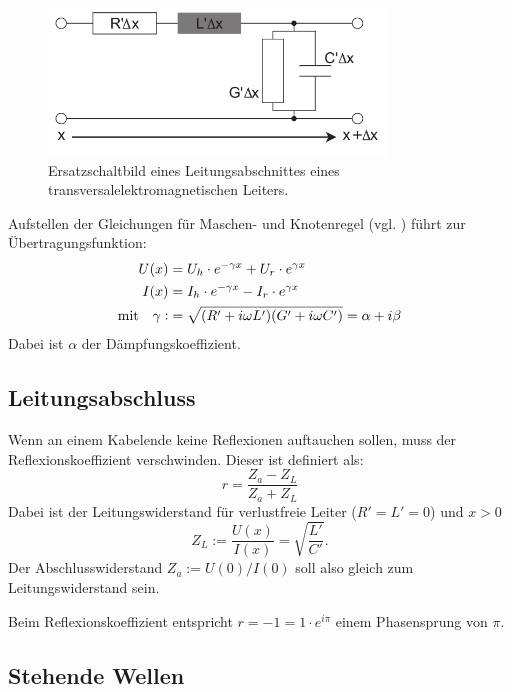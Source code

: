 \documentclass[
	a4paper,
	12pt,
	pagesize,
	ngerman
]{scrartcl}
\begin{document}
	\begin{figure}[H]
		\includegraphics[width=0.8\textwidth]{img/ersatzschaltbild}
		\centering
		\caption{
			Ersatzschaltbild eines Leitungsabschnittes eines transversalelektromagnetischen Leiters. \cite{Anleitung}
		}
		\label{fig_ersatzschaltbild}
		\centering
	\end{figure}

	Aufstellen der Gleichungen für Maschen- und Knotenregel (vgl. \cite{Anleitung} ) führt zur Übertragungsfunktion:
	\begin{align}
		U(x) &= U_h \cdot e^{-\gamma x} + U_r \cdot e^{\gamma x}\\
		I(x) &= I_h \cdot e^{-\gamma x} - I_r \cdot e^{\gamma x}\\
		\text{mit} \quad \gamma \vcentcolon &= \sqrt{(R'+i \omega L')(G' +i \omega C')} = \alpha + i \beta
	\end{align}
	Dabei ist $\alpha $ der Dämpfungskoeffizient.

	\subsection{Leitungsabschluss}
	Wenn an einem Kabelende keine Reflexionen auftauchen sollen, muss der Reflexionskoeffizient verschwinden.
	Dieser ist definiert als:
	\begin{equation}
		r = \frac{Z_a-Z_L}{Z_a+Z_L} %
	\end{equation}
	Dabei ist der  Leitungswiderstand für verlustfreie Leiter ($R'=L'=0$) und $x>0$
	\begin{equation}
		Z_L:=\frac{U(x)}{I(x)}=\sqrt{\frac{L'}{C'}}.
	\end{equation}
	Der Abschlusswiderstand $Z_a:=U(0)/I(0)$ soll also gleich zum Leitungswiderstand sein.

	Beim Reflexionskoeffizient entspricht $r=-1=1 \cdot e^{i\pi}$ einem Phasensprung von $\pi$.

	\subsection{Stehende Wellen}
\end{document}
